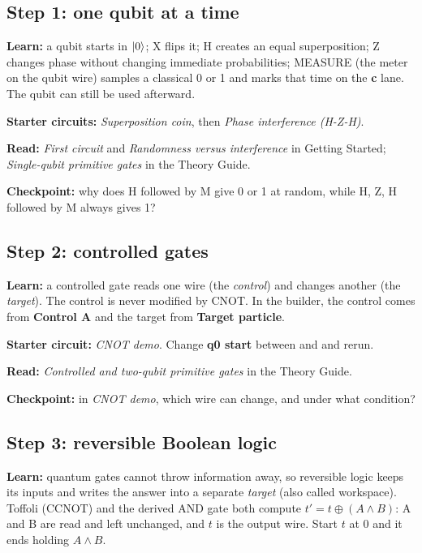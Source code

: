 \subsection{Step 1: one qubit at a time}

\textbf{Learn:} a qubit starts in $\lvert 0\rangle$; X flips it; H creates an equal
superposition; Z changes phase without changing immediate probabilities;
MEASURE (the meter on the qubit wire) samples a classical 0 or 1 and marks that time on the \textbf{c} lane. The qubit can still be used afterward.

\textbf{Starter circuits:} \emph{Superposition coin}, then
\emph{Phase interference (H-Z-H)}.

\textbf{Read:} \emph{First circuit} and \emph{Randomness versus interference}
in Getting Started; \emph{Single-qubit primitive gates} in the Theory Guide.

\textbf{Checkpoint:} why does H followed by M give 0 or 1 at random, while
H, Z, H followed by M always gives 1?

\subsection{Step 2: controlled gates}

\textbf{Learn:} a controlled gate reads one wire (the \emph{control}) and
changes another (the \emph{target}). The control is never modified by CNOT.
In the builder, the control comes from \textbf{Control A} and the target from
\textbf{Target particle}.

\textbf{Starter circuit:} \emph{CNOT demo}. Change \textbf{q0 start} between
 and  and rerun.

\textbf{Read:} \emph{Controlled and two-qubit primitive gates} in the Theory
Guide.

\textbf{Checkpoint:} in \emph{CNOT demo}, which wire can change, and under what
condition?

\subsection{Step 3: reversible Boolean logic}

\textbf{Learn:} quantum gates cannot throw information away, so reversible
logic keeps its inputs and writes the answer into a separate
\emph{target} (also called workspace). Toffoli (CCNOT) and the derived AND gate
both compute $t'=t\oplus(A\land B)$: A and B are read and left unchanged, and
$t$ is the output wire. Start $t$ at 0 and it ends holding $A\land B$.

